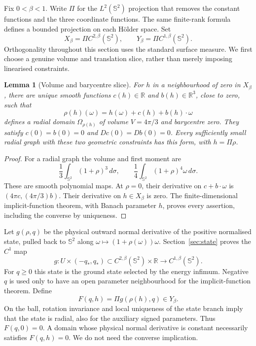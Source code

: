 \documentclass[11pt,a4paper]{article}
\newtheorem{lemma}[theorem]{Lemma}
\theoremstyle{definition}
\theoremstyle{remark}
\begin{document}
Fix $0<\beta<1$. Write $\Pi$ for the $L^2(\mathbb S^2)$ projection that removes the constant functions and the three coordinate functions. The same finite-rank formula defines a bounded projection on each H\"older space. Set
\[
 X_\beta=\Pi C^{2,\beta}(\mathbb S^2),\qquad
 Y_\beta=\Pi C^{1,\beta}(\mathbb S^2).
\]
Orthogonality throughout this section uses the standard surface measure. We first choose a genuine volume and translation slice, rather than merely imposing linearised constraints.

\begin{lemma}[Volume and barycentre slice]\label{lem:gauge}
For $h$ in a neighbourhood of zero in $X_\beta$, there are unique smooth functions $c(h)\in\mathbb R$ and $b(h)\in\mathbb R^3$, close to zero, such that
\[
 \rho(h)(\omega)=h(\omega)+c(h)+b(h)\cdot\omega
\]
defines a radial domain $\Omega_{\rho(h)}$ of volume $V=4\pi/3$ and barycentre zero. They satisfy $c(0)=b(0)=0$ and $Dc(0)=Db(0)=0$. Every sufficiently small radial graph with these two geometric constraints has this form, with $h=\Pi\rho$.
\end{lemma}
\begin{proof}
For a radial graph the volume and first moment are
\[
 \frac13\int_{\mathbb S^2}(1+\rho)^3\,d\sigma,
 \qquad \frac14\int_{\mathbb S^2}(1+\rho)^4\omega\,d\sigma.
\]
These are smooth polynomial maps. At $\rho=0$, their derivative on $c+b\cdot\omega$ is $(4\pi c,(4\pi/3)b)$. Their derivative on $h\in X_\beta$ is zero. The finite-dimensional implicit-function theorem, with Banach parameter $h$, proves every assertion, including the converse by uniqueness.
\end{proof}

Let $g(\rho,q)$ be the physical outward normal derivative of the positive normalised state, pulled back to $\mathbb S^2$ along $\omega\mapsto(1+\rho(\omega))\omega$. Section~\ref{sec:state} proves the $C^1$ map
\[
 g:U\times(-q_*,q_*)\subset C^{2,\beta}(\mathbb S^2)\times\mathbb R
       \longrightarrow C^{1,\beta}(\mathbb S^2).
\]
For $q\geq0$ this state is the ground state selected by the energy infimum. Negative $q$ is used only to have an open parameter neighbourhood for the implicit-function theorem. Define
\[
 F(q,h)=\Pi g(\rho(h),q)\in Y_\beta.
\]
On the ball, rotation invariance and local uniqueness of the state branch imply that the state is radial, also for the auxiliary signed parameters. Thus $F(q,0)=0$. A domain whose physical normal derivative is constant necessarily satisfies $F(q,h)=0$. We do not need the converse implication.
\end{document}
